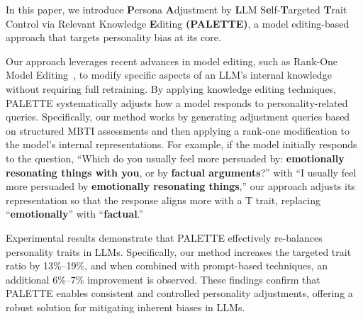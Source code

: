 In this paper, we introduce \textbf{P}ersona \textbf{A}djustment by \textbf{L}LM S\textbf{e}lf-\textbf{T}argeted \textbf{T}rait Control via Relevant Knowledge \textbf{E}diting \textbf{(PALETTE)}, a model editing-based approach that targets personality bias at its core.

Our approach leverages recent advances in model editing, such as Rank-One Model Editing~\cite{meng2023locatingeditingfactualassociations}, to modify specific aspects of an LLM’s internal knowledge without requiring full retraining.
By applying knowledge editing techniques, PALETTE systematically adjusts how a model responds to personality-related queries. Specifically, our method works by generating adjustment queries based on structured MBTI assessments and then applying a rank-one modification to the model’s internal representations.
For example, if the model initially responds to the question, “Which do you usually feel more persuaded by: \textbf{emotionally resonating things with you}, or by \textbf{factual arguments}?” with “I usually feel more persuaded by \textbf{emotionally resonating things},” our approach adjusts its representation so that the response aligns more with a T trait, replacing “\textbf{emotionally}” with “\textbf{factual}.”

Experimental results demonstrate that PALETTE effectively re-balances personality traits in LLMs. Specifically, our method increases the targeted trait ratio by 13\%–19\%, and when combined with prompt-based techniques, an additional 6\%–7\% improvement is observed. These findings confirm that PALETTE enables consistent and controlled personality adjustments, offering a robust solution for mitigating inherent biases in LLMs.